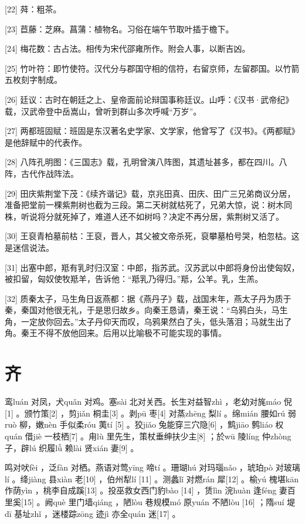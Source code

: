 \documentclass[12pt,UTF8]{ctexbook}
\begin{document}
[22] 荈：粗茶。

[23] 苣藤：芝麻。菖蒲：植物名。习俗在端午节取叶插于檐下。

[24] 梅花数：古占法。相传为宋代邵雍所作。附会人事，以断吉凶。

[25] 竹叶符：即竹使符。汉代分与郡国守相的信符，右留京师，左留郡国。以竹箭五枚刻字制成。

[26] 廷议：古时在朝廷之上、皇帝面前论辩国事称廷议。山呼：《汉书·武帝纪》载，汉武帝登中岳嵩山，曾听到群山多次呼喊“万岁”。

[27] 两都班固赋：班固是东汉著名史学家、文学家，他曾写了《汉书》。《两都赋》是他辞赋中的代表作。

[28] 八阵孔明图：《三国志》载，孔明曾演八阵图，其遗址甚多，都在四川。八阵，古代作战阵法。

[29] 田庆紫荆堂下茂：《续齐谐记》载，京兆田真、田庆、田广三兄弟商议分居，准备把堂前一棵紫荆树也截为三段。第二天树就枯死了，兄弟大惊，说：树木同株，听说将分就死掉了，难道人还不如树吗？决定不再分居，紫荆树又活了。

[30] 王裒青柏墓前枯：王裒，晋人，其父被文帝杀死，裒攀墓柏号哭，柏忽枯。这是迷信说法。

[31] 出塞中郎，羝有乳时归汉室：中郎，指苏武。汉苏武以中郎将身份出使匈奴，被扣留，匈奴使牧羝羊，告诉他：“羝乳乃得归。”羝，公羊。乳，生羔。

[32] 质秦太子，马生角日返燕都：据《燕丹子》载，战国末年，燕太子丹为质于秦，秦国对他很无礼，于是思归故乡。向秦王恳请，秦王说：“乌鸦白头，马生角，一定放你回去。”太子丹仰天而叹，乌鸦果然白了头，低头落泪；马就生出了角。秦王不得不放他回来。后用以比喻极不可能实现的事情。





\chapter{齐}


鸾luán 对凤，犬quǎn 对鸡。塞sài 北对关西。长生对益智zhì ，老幼对旄máo 倪[1] 。颁竹策[2] ，剪jiǎn 桐圭[3] 。剥pū 枣[4] 对蒸zhēng 梨lí 。绵mián 腰如rú 弱ruò 柳，嫩nèn 手似柔róu 荑tí [5] 。狡jiǎo 兔能穿三穴隐[6] ，鹪jiāo 鹩liáo 权quán 借jiè 一枝栖[7] 。甪lù 里先生，策杖垂绅扶少主[8] ；於wū 陵líng 仲zhòng 子，辟lú 织履lǚ 赖lài 贤xián 妻[9] 。

鸣对吠fèi ，泛fàn 对栖。燕语对莺yīng 啼tí 。珊瑚hú 对玛瑙nǎo ，琥珀pò 对玻璃lí 。绛jiàng 县xiàn 老[10] ，伯州犁lí [11] 。测蠡lǐ 对燃rán 犀[12] 。榆yú 槐堪kān 作荫yìn ，桃李自成蹊[13] 。投巫救女西门豹bào [14] ，赁lìn 浣huàn 逢féng 妻百里奚[15] 。阙què 里门墙qiáng ，陋lòu 巷规模mó 原yuán 不陋lòu [16] ；隋suí 堤dī 基址zhǐ ，迷楼踪zōng 迹jì 亦全quán 迷[17] 。
\end{document}
